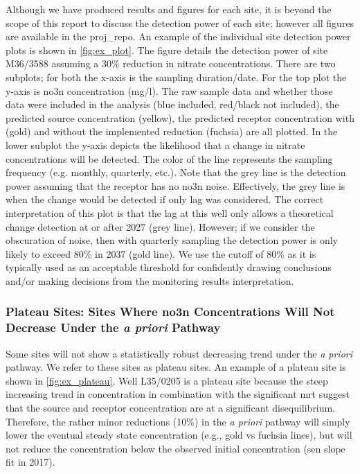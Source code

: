 Although we have produced results and figures for each site, it is beyond the scope of this report to discuss the detection power of each site; however all figures are available in the \gls{proj_repo}.
An example of the individual site detection power plots is shown in \autoref{fig:ex_plot}.
The figure details the detection power of site M36/3588 assuming a 30\% reduction in nitrate concentrations.
There are two subplots; for both the x-axis is the sampling duration/date.
For the top plot the y-axis is \gls{no3n} concentration (mg/l).
The raw sample data and whether those data were included in the analysis (blue included, red/black not included), the predicted source concentration (yellow), the predicted receptor concentration with (gold) and without the implemented reduction (fuchsia) are all plotted.
In the lower subplot the y-axis depicts the likelihood that a change in nitrate concentrations will be detected.
The color of the line represents the sampling frequency (e.g. monthly, quarterly, etc.).
Note that the grey line is the detection power assuming that the receptor has no \gls{no3n} noise.
Effectively, the grey line is when the change would be detected if only lag was considered.
The correct interpretation of this plot is that the lag at this well only allows a theoretical change detection at or after 2027 (grey line).
However; if we consider the obscuration of noise, then with quarterly sampling the detection power is only likely to exceed 80\% in 2037 (gold line).
We use the cutoff of 80\% as it is typically used as an acceptable threshold for confidently drawing conclusions and/or making decisions from the monitoring results interpretation\citep{dumont_determining_nodate}.


\subsubsection[Plateau Sites]{Plateau Sites: Sites Where \gls{no3n} Concentrations Will Not Decrease Under the \textit{a priori} Pathway} \label{sec:plateau_results}



Some sites will not show a statistically robust decreasing trend under the \textit{a priori} pathway.
We refer to these sites as plateau sites. An example of a plateau site is shown in \autoref{fig:ex_plateau}.
Well L35/0205 is a plateau site because the steep increasing trend in concentration in combination with the significant \gls{mrt} suggest that the source and receptor concentration are at a significant disequilibrium.
Therefore, the rather minor reductions (10\%) in the \textit{a priori} pathway will simply lower the eventual steady state concentration (e.g., gold vs fuchsia lines), but will not reduce the concentration below the observed initial concentration (sen slope fit in 2017).

